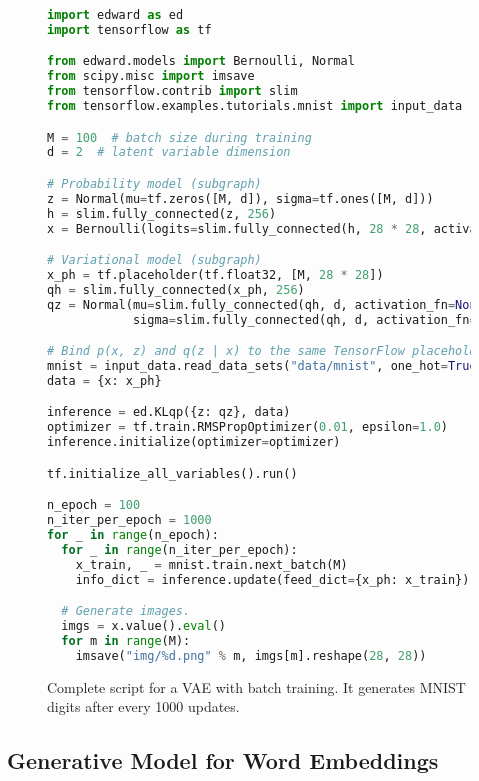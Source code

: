 \begin{figure}[!h]
\begin{lstlisting}[language=python]
import edward as ed
import tensorflow as tf

from edward.models import Bernoulli, Normal
from scipy.misc import imsave
from tensorflow.contrib import slim
from tensorflow.examples.tutorials.mnist import input_data

M = 100  # batch size during training
d = 2  # latent variable dimension

# Probability model (subgraph)
z = Normal(mu=tf.zeros([M, d]), sigma=tf.ones([M, d]))
h = slim.fully_connected(z, 256)
x = Bernoulli(logits=slim.fully_connected(h, 28 * 28, activation_fn=None))

# Variational model (subgraph)
x_ph = tf.placeholder(tf.float32, [M, 28 * 28])
qh = slim.fully_connected(x_ph, 256)
qz = Normal(mu=slim.fully_connected(qh, d, activation_fn=None),
            sigma=slim.fully_connected(qh, d, activation_fn=tf.nn.softplus))

# Bind p(x, z) and q(z | x) to the same TensorFlow placeholder for x.
mnist = input_data.read_data_sets("data/mnist", one_hot=True)
data = {x: x_ph}

inference = ed.KLqp({z: qz}, data)
optimizer = tf.train.RMSPropOptimizer(0.01, epsilon=1.0)
inference.initialize(optimizer=optimizer)

tf.initialize_all_variables().run()

n_epoch = 100
n_iter_per_epoch = 1000
for _ in range(n_epoch):
  for _ in range(n_iter_per_epoch):
    x_train, _ = mnist.train.next_batch(M)
    info_dict = inference.update(feed_dict={x_ph: x_train})

  # Generate images.
  imgs = x.value().eval()
  for m in range(M):
    imsave("img/%d.png" % m, imgs[m].reshape(28, 28))
\end{lstlisting}
\caption{Complete script for a \gls{VAE}
\citep{kingma2014autoencoding} with batch training.
It generates MNIST digits after every 1000 updates.}
\label{fig:appendix_vae}
\end{figure}

\subsection{Generative Model for Word Embeddings}
\label{appendix:ef_emb}

